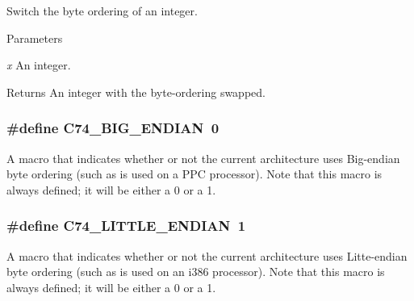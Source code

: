 Switch the byte ordering of an integer. 
\begin{DoxyParams}{Parameters}
\item[{\em x}]An integer. \end{DoxyParams}
\begin{DoxyReturn}{Returns}
An integer with the byte-\/ordering swapped. 
\end{DoxyReturn}
\hypertarget{group__byteorder_ga51aafb747c672a9623c9b6e851c5cb53}{
\subsubsection[{C74\_\-BIG\_\-ENDIAN}]{\setlength{\rightskip}{0pt plus 5cm}\#define C74\_\-BIG\_\-ENDIAN~0}}
\label{group__byteorder_ga51aafb747c672a9623c9b6e851c5cb53}


A macro that indicates whether or not the current architecture uses Big-\/endian byte ordering (such as is used on a PPC processor). Note that this macro is always defined; it will be either a 0 or a 1. \hypertarget{group__byteorder_gaa1bcf3a033a866ca81d51e9f65ec4d3a}{
\subsubsection[{C74\_\-LITTLE\_\-ENDIAN}]{\setlength{\rightskip}{0pt plus 5cm}\#define C74\_\-LITTLE\_\-ENDIAN~1}}
\label{group__byteorder_gaa1bcf3a033a866ca81d51e9f65ec4d3a}


A macro that indicates whether or not the current architecture uses Litte-\/endian byte ordering (such as is used on an i386 processor). Note that this macro is always defined; it will be either a 0 or a 1. 